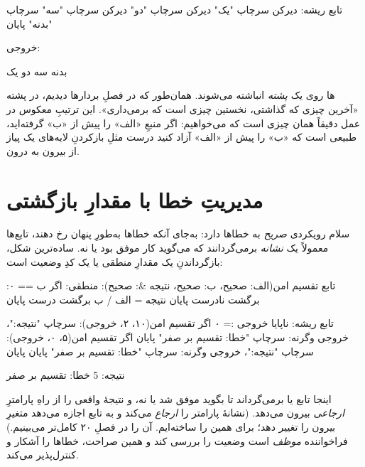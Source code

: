 \begin{salamfa}
تابع ریشه:
    دیرکن سرچاپ "یک"
    دیرکن سرچاپ "دو"
    دیرکن سرچاپ "سه"
    سرچاپ "بدنه"
پایان
\end{salamfa}

خروجی:

\begin{progoutfa}
بدنه
سه
دو
یک
\end{progoutfa}

\begin{deep}
ها روی یک \emph{پشته} انباشته می‌شوند. همان‌طور که در فصلِ بردارها
دیدیم، در پشته «آخرین چیزی که گذاشتی، نخستین چیزی است که برمی‌داری». این ترتیبِ
معکوس در عمل دقیقاً همان چیزی است که می‌خواهیم: اگر منبعِ «الف» را پیش از «ب»
گرفته‌اید، طبیعی است که «ب» را پیش از «الف» آزاد کنید درست مثلِ بازکردنِ
لایه‌های یک پیاز از بیرون به درون.
\end{deep}

\section{مدیریتِ خطا با مقدارِ بازگشتی}

سلام رویکردی \emph{صریح} به خطاها دارد: به‌جای آنکه خطاها به‌طورِ پنهان رخ
دهند، تابع‌ها معمولاً یک \emph{نشانه} برمی‌گردانند که می‌گوید کار موفق بود یا
نه. ساده‌ترین شکل، بازگرداندنِ یک مقدارِ منطقی یا یک کدِ وضعیت است:

\begin{salamfa}
تابع تقسیم امن(الف: صحیح، ب: صحیح، نتیجه &: صحیح): منطقی:
    اگر ب == ۰:
        برگشت نادرست
    پایان
    نتیجه = الف / ب
    برگشت درست
پایان

تابع ریشه:
    ناپایا خروجی := ۰
    اگر تقسیم امن(۱۰، ۲، خروجی):
        سرچاپ "نتیجه:"، خروجی
    وگرنه:
        سرچاپ "خطا: تقسیم بر صفر"
    پایان
    اگر تقسیم امن(۵، ۰، خروجی):
        سرچاپ "نتیجه:"، خروجی
    وگرنه:
        سرچاپ "خطا: تقسیم بر صفر"
    پایان
پایان
\end{salamfa}

\begin{progoutfa}
نتیجه: 5
خطا: تقسیم بر صفر
\end{progoutfa}

اینجا تابع  یا  برمی‌گرداند تا بگوید موفق شد یا نه، و
نتیجهٔ واقعی را از راهِ پارامترِ \emph{ارجاعی}  بیرون
می‌دهد. (نشانهٔ \code{\&:} پارامتر را \emph{ارجاع} می‌کند و به تابع اجازه می‌دهد
متغیرِ بیرون را تغییر دهد؛ برای همین  را  ساخته‌ایم.
آن را در فصلِ ۲۰ کامل‌تر می‌بینیم.) فراخواننده
\emph{موظف} است وضعیت را بررسی کند و همین صراحت، خطاها را آشکار و کنترل‌پذیر
می‌کند.

